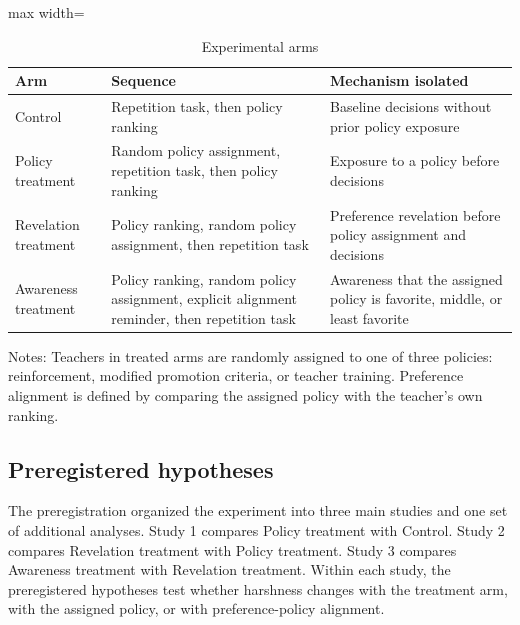 \documentclass[12pt,a4paper]{article}
\begin{document}
\begin{table}[!htbp]
\centering
\caption{Experimental arms}
\label{tab:design}
\begin{threeparttable}
\begin{adjustbox}{max width=\textwidth}
\begin{tabular}{p{}p{}p{}}
\toprule
Arm & Sequence & Mechanism isolated \\
\midrule
Control & Repetition task, then policy ranking & Baseline decisions without prior policy exposure \\
Policy treatment & Random policy assignment, repetition task, then policy ranking & Exposure to a policy before decisions \\
Revelation treatment & Policy ranking, random policy assignment, then repetition task & Preference revelation before policy assignment and decisions \\
Awareness treatment & Policy ranking, random policy assignment, explicit alignment reminder, then repetition task & Awareness that the assigned policy is favorite, middle, or least favorite \\
\bottomrule
\end{tabular}
\end{adjustbox}
\begin{tablenotes}[flushleft]
\footnotesize
\item Notes: Teachers in treated arms are randomly assigned to one of three policies: reinforcement, modified promotion criteria, or teacher training. Preference alignment is defined by comparing the assigned policy with the teacher's own ranking.
\end{tablenotes}
\end{threeparttable}
\end{table}

\subsection{Preregistered hypotheses}

The preregistration organized the experiment into three main studies and one set of additional analyses. Study 1 compares Policy treatment with Control. Study 2 compares Revelation treatment with Policy treatment. Study 3 compares Awareness treatment with Revelation treatment. Within each study, the preregistered hypotheses test whether harshness changes with the treatment arm, with the assigned policy, or with preference-policy alignment.
\end{document}
